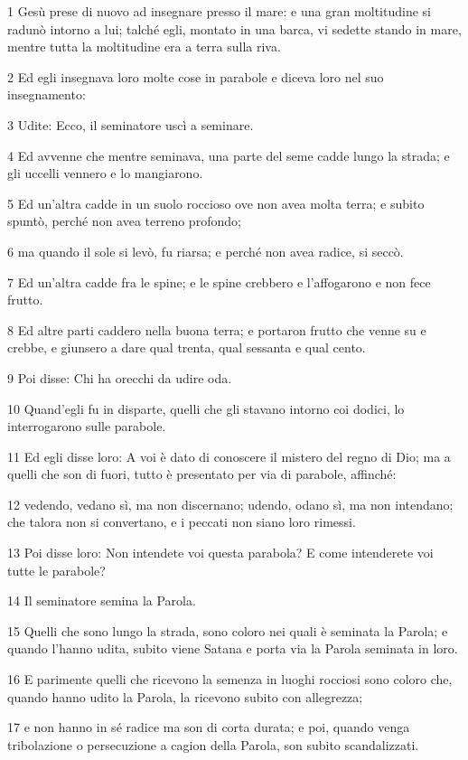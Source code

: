 \par 1 Gesù prese di nuovo ad insegnare presso il mare: e una gran moltitudine si radunò intorno a lui; talché egli, montato in una barca, vi sedette stando in mare, mentre tutta la moltitudine era a terra sulla riva.
\par 2 Ed egli insegnava loro molte cose in parabole e diceva loro nel suo insegnamento:
\par 3 Udite: Ecco, il seminatore uscì a seminare.
\par 4 Ed avvenne che mentre seminava, una parte del seme cadde lungo la strada; e gli uccelli vennero e lo mangiarono.
\par 5 Ed un'altra cadde in un suolo roccioso ove non avea molta terra; e subito spuntò, perché non avea terreno profondo;
\par 6 ma quando il sole si levò, fu riarsa; e perché non avea radice, si seccò.
\par 7 Ed un'altra cadde fra le spine; e le spine crebbero e l'affogarono e non fece frutto.
\par 8 Ed altre parti caddero nella buona terra; e portaron frutto che venne su e crebbe, e giunsero a dare qual trenta, qual sessanta e qual cento.
\par 9 Poi disse: Chi ha orecchi da udire oda.
\par 10 Quand'egli fu in disparte, quelli che gli stavano intorno coi dodici, lo interrogarono sulle parabole.
\par 11 Ed egli disse loro: A voi è dato di conoscere il mistero del regno di Dio; ma a quelli che son di fuori, tutto è presentato per via di parabole, affinché:
\par 12 vedendo, vedano sì, ma non discernano; udendo, odano sì, ma non intendano; che talora non si convertano, e i peccati non siano loro rimessi.
\par 13 Poi disse loro: Non intendete voi questa parabola? E come intenderete voi tutte le parabole?
\par 14 Il seminatore semina la Parola.
\par 15 Quelli che sono lungo la strada, sono coloro nei quali è seminata la Parola; e quando l'hanno udita, subito viene Satana e porta via la Parola seminata in loro.
\par 16 E parimente quelli che ricevono la semenza in luoghi rocciosi sono coloro che, quando hanno udito la Parola, la ricevono subito con allegrezza;
\par 17 e non hanno in sé radice ma son di corta durata; e poi, quando venga tribolazione o persecuzione a cagion della Parola, son subito scandalizzati.
